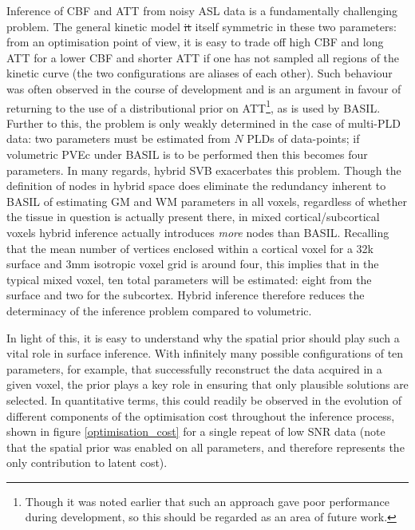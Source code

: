 \documentclass[12pt]{report}
\providecommand{\DIFaddtex}[1]{{\protect\color{blue}\uwave{#1}}} %
\providecommand{\DIFdeltex}[1]{{\protect\color{red}\sout{#1}}}                      %
\providecommand{\DIFaddbegin}{} %
\providecommand{\DIFaddend}{} %
\providecommand{\DIFdelbegin}{} %
\providecommand{\DIFdelend}{} %
\providecommand{\DIFadd}[1]{\texorpdfstring{\DIFaddtex{#1}}{#1}} %
\providecommand{\DIFdel}[1]{\texorpdfstring{\DIFdeltex{#1}}{}} %
\newcommand{\DIFscaledelfig}{0.5}
\newlength{\DIFdelgraphicswidth} %
\newlength{\DIFdelgraphicsheight} %
\newcommand{\DIFaddincludegraphics}[2][]{{\color{blue}\fbox{\DIFOincludegraphics[#1]{#2}}}} %
\newcommand{\DIFdelincludegraphics}[2][]{%
\sbox{\DIFdelgraphicsbox}{\DIFOincludegraphics[#1]{#2}}%
\settoboxwidth{\DIFdelgraphicswidth}{\DIFdelgraphicsbox} %
\settoboxtotalheight{\DIFdelgraphicsheight}{\DIFdelgraphicsbox} %
\scalebox{\DIFscaledelfig}{%
\parbox[b]{\DIFdelgraphicswidth}{\usebox{\DIFdelgraphicsbox}\\[-\baselineskip] \rule{\DIFdelgraphicswidth}{0em}}\llap{\resizebox{\DIFdelgraphicswidth}{\DIFdelgraphicsheight}{%
\setlength{\unitlength}{\DIFdelgraphicswidth}%
\begin{picture}(1,1)%
\thicklines\linethickness{2pt} %
{\color[rgb]{1,0,0}\put(0,0){\framebox(1,1){}}}%
{\color[rgb]{1,0,0}\put(0,0){\line( 1,1){1}}}%
{\color[rgb]{1,0,0}\put(0,1){\line(1,-1){1}}}%
\end{picture}%
}\hspace*{3pt}}} %
} %
\DeclareRobustCommand{\DIFaddbegin}{\DIFOaddbegin \let\includegraphics\DIFaddincludegraphics} %
\DeclareRobustCommand{\DIFaddend}{\DIFOaddend \let\includegraphics\DIFOincludegraphics} %
\DeclareRobustCommand{\DIFdelbegin}{\DIFOdelbegin \let\includegraphics\DIFdelincludegraphics} %
\DeclareRobustCommand{\DIFdelend}{\DIFOaddend \let\includegraphics\DIFOincludegraphics} %
\begin{document}
Inference of CBF and ATT from noisy ASL data is a fundamentally challenging problem. The general kinetic model \DIFdelbegin \DIFdel{it }\DIFdelend \DIFaddbegin \DIFadd{is }\DIFaddend itself symmetric in these two parameters: from an optimisation point of view, it is easy to trade off high CBF and long ATT for a lower CBF and shorter ATT if one has not sampled all regions of the kinetic curve (the two configurations are aliases of each other). Such behaviour was often observed in the course of development and is an argument in favour of returning to the use of a distributional prior on ATT\footnote{Though it was noted earlier that such an approach gave poor performance during development, so this should be regarded as an area of future work.}, as is used by BASIL. Further to this, the problem is only weakly determined in the case of multi-PLD data: two parameters must be estimated from $N$ PLDs of data-points; if volumetric PVEc under BASIL is to be performed then this becomes four parameters. In many regards, hybrid SVB exacerbates this problem. Though the definition of nodes in hybrid space does eliminate the redundancy inherent to BASIL of estimating GM and WM parameters in all voxels, regardless of whether the tissue in question is actually present there, in mixed cortical/subcortical voxels hybrid inference actually introduces \textit{more} nodes than BASIL. Recalling that the mean number of vertices enclosed within a cortical voxel for a 32k surface and 3mm isotropic voxel grid is around four, this implies that in the typical mixed voxel, ten total parameters will be estimated: eight from the surface and two for the subcortex. Hybrid inference therefore reduces the determinacy of the inference problem compared to volumetric. 

In light of this, it is easy to understand why the spatial prior should play such a vital role in surface inference. With infinitely many possible configurations of ten parameters, for example, that successfully reconstruct the data acquired in a given voxel, the prior plays a key role in ensuring that only plausible solutions are selected. In quantitative terms, this could readily be observed in the evolution of different components of the optimisation cost throughout the inference process, shown in figure \ref{optimisation_cost} for a single repeat of low SNR data (note that the spatial prior was enabled on all parameters, and therefore represents the only contribution to latent cost). 
\end{document}
